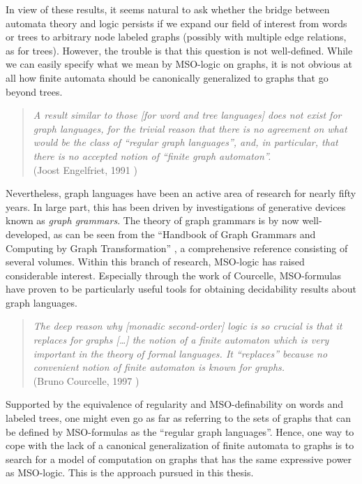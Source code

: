 \documentclass[a4paper,11pt,twoside]{report} \pdfoutput=1
\begin{document}
In view of these results, it seems natural to ask whether the bridge
between automata theory and logic persists if we expand our field of
interest from words or trees to arbitrary node labeled graphs
(possibly with multiple edge relations, as for trees). However, the
trouble is that this question is not well-defined. While we can easily
specify what we mean by MSO-logic on graphs, it is not obvious at all
how finite automata should be canonically generalized to graphs that
go beyond trees.

\begin{quote}
  \emph{A result similar to those \emph{[for word and tree languages]}
    does not exist for graph languages, for the trivial reason that
    there is no agreement on what would be the class of “regular graph
    languages”, and, in particular, that there is no accepted notion
    of “finite graph automaton”.} \\
  \hspace*{\fill} (Joost Engelfriet, 1991 \cite[p.~139]{Eng91})
\end{quote}

Nevertheless, graph languages have been an active area of research for
nearly fifty years. In large part, this has been driven by
investigations of generative devices known as \emph{graph grammars}.
The theory of graph grammars is by now well-developed, as can be seen
from the “Handbook of Graph Grammars and Computing by Graph
Transformation” \cite{HGG97-99}, a comprehensive reference consisting
of several volumes. Within this branch of research, MSO-logic has
raised considerable interest. Especially through the work of
Courcelle, MSO-formulas have proven to be particularly useful tools
for obtaining decidability results about graph languages.

\begin{quote}
  \emph{The deep reason why \emph{[monadic second-order]} logic is so
    crucial is that it replaces for graphs \emph{[…\!]} the notion of
    a finite automaton which is very important in the theory of formal
    languages. It “replaces” because no convenient notion of finite
    automaton is known for graphs.} \\
  \hspace*{\fill} (Bruno Courcelle, 1997 \cite[p.~315]{Cou97})
\end{quote}

Supported by the equivalence of regularity and MSO-definability on
words and labeled trees, one might even go as far as referring to the
sets of graphs that can be defined by MSO-formulas as the “regular
graph languages”. Hence, one way to cope with the lack of a canonical
generalization of finite automata to graphs is to search for a model
of computation on graphs that has the same expressive power as
MSO-logic. This is the approach pursued in this thesis.
\end{document}
